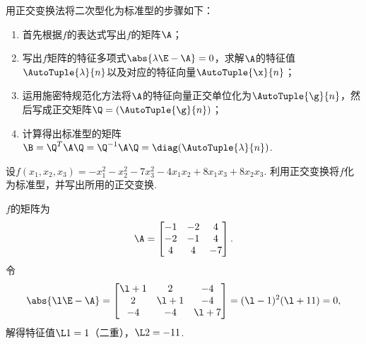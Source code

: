 \begingroup
\color{red}
用正交变换法将二次型化为标准型的步骤如下：
\begin{enumerate}
\item 首先根据\(f\)的表达式写出\(f\)的矩阵\(\A\)；
\item 写出\(f\)矩阵的特征多项式\(\abs{\lambda\E-\A}=0\)，求解\(\A\)的特征值\(\AutoTuple{\lambda}{n}\)以及对应的特征向量\(\AutoTuple{\x}{n}\)；
\item 运用施密特规范化方法将\(\A\)的特征向量正交单位化为\(\AutoTuple{\g}{n}\)，然后写成正交矩阵\(\Q=(\AutoTuple{\g}{n})\)；
\item 计算得出标准型的矩阵\(\B=\Q^T\A\Q=\Q^{-1}\A\Q=\diag(\AutoTuple{\lambda}{n})\).
\end{enumerate}
\endgroup

\begin{example}
设\(f(x_1,x_2,x_3) = -x_1^2-x_2^2-7x_3^2-4x_1x_2+8x_1x_3+8x_2x_3\).
利用正交变换将\(f\)化为标准型，并写出所用的正交变换.
\begin{solution}
\def\z{\mat{Z}}%
\(f\)的矩阵为\[
\A = \begin{bmatrix}
-1 & -2 & 4 \\
-2 & -1 & 4 \\
4 & 4 & -7
\end{bmatrix}.
\]令\[
\abs{\l\E-\A} = \begin{bmatrix}
\l+1 & 2 & -4 \\
2 & \l+1 & -4 \\
-4 & -4 & \l+7
\end{bmatrix} = (\l-1)^2 (\l+11) = 0,
\]解得特征值\(\L1=1\)（二重），\(\L2=-11\).


\end{solution}
\end{example}
